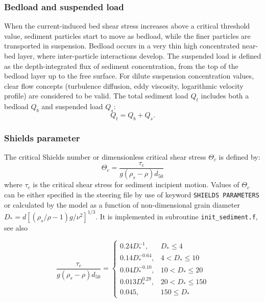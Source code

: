 \subsubsection{Bedload and suspended load}
When the current-induced bed shear stress increases above a critical
threshold value, sediment particles start to move as bedload, while the
finer particles are transported in suspension. Bedload occurs in a very thin high concentrated near-bed layer, where
inter-particle interactions develop. The suspended load is defined as the depth-integrated flux of sediment
concentration, from the top of the bedload layer up to the free surface.
For dilute suspension concentration values, clear flow concepts (turbulence diffusion, eddy
viscosity, logarithmic velocity profile) are considered to be valid.
The total sediment load $Q_t$ includes both a bedload $Q_b$ and suspended load $Q_s$:
\begin{equation}\label{eq:Qt}
Q_t  = Q_b + Q_s. 
\end{equation}

\subsubsection{Shields parameter}
The critical Shields number or dimensionless critical shear stress $\Theta_c$
is defined by:
\begin{equation}\label{eq:shields}
\Theta_c = \frac{\tau_c}{g(\rho_s -\rho)d_{50}} 
\end{equation}
where $\tau_c$ is the critical shear stress for sediment incipient motion. Values of $\Theta_c$
can be either specified in the \sisyphe steering file by use of keyword \texttt{SHIELDS PARAMETERS}
 or calculated by the model as a function of
non-dimensional grain diameter $D_* =d[(\rho_s/\rho-1)g/\nu^2]^{1/3}$. It is implemented in subroutine 
\texttt{init\_sediment.f}, see also~\cite{XXX}

\begin{equation*}
\frac{\tau_c}{g(\rho_s -\rho)d_{50}}=\left\{\begin{array}{ll}
0.24 D_*^{-1}, & D_* \leq 4 \\
0.14 D_*^{-0.64}, & 4 < D_* \leq 10 \\
 0.04 D_*^{-0.10}, & 10 < D_* \leq 20\\
0.013 D_*^{0.29}, & 20 < D_* \leq 150 \\
0.045, & 150 \leq D_* 
\end{array}
\right.
\end{equation*}

